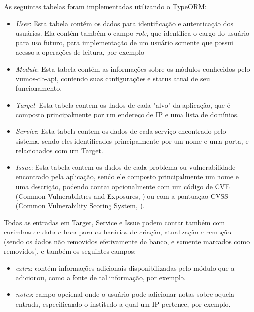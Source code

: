     As seguintes tabelas foram implementadas utilizando o TypeORM:
    \begin{itemize}
        \item \emph{User}: Esta tabela contém os dados para identificação e autenticação dos usuários. Ela contém também o campo \textit{role}, que identifica o cargo do usuário para uso futuro, para implementação de um usuário somente que possui acesso a operações de leitura, por exemplo.
        
        \item \emph{Module}: Esta tabela contém as informações sobre os módulos conhecidos pelo vumos-db-api, contendo suas configurações e status atual de seu funcionamento.
        
        \item \emph{Target}: Esta tabela contem os dados de cada "alvo" da aplicação, que é composto principalmente por um endereço de IP e uma lista de domínios.
        
        \item \emph{Service}: Esta tabela contem os dados de cada serviço encontrado pelo sistema, sendo eles identificados principalmente por um nome e uma porta, e relacionados com um Target.
        
        \item \emph{Issue}: Esta tabela contem os dados de cada problema ou vulnerabilidade encontrado pela aplicação, sendo ele composto principalmente um nome e uma descrição, podendo contar opcionalmente com um código de CVE (Common Vulnerabilities and Exposures, \cite{mell2002use}) ou com a pontuação CVSS (Common Vulnerability Scoring System, \cite{scarfone2009analysis}).
    \end{itemize}
    
    Todas as entradas em Target, Service e Issue podem contar também com carimbos de data e hora para os horários de criação, atualização e remoção (sendo os dados não removidos efetivamente do banco, e somente marcados como removidos), e também os seguintes campos: 
    \begin{itemize}
        \item \emph{extra}: contém informações adicionais disponibilizadas pelo módulo que a adicionou, como a fonte de tal informação, por exemplo.
        \item \emph{notes}: campo opcional onde o usuário pode adicionar notas sobre aquela entrada, especificando o institudo a qual um IP pertence, por exemplo.
    \end{itemize}
    

